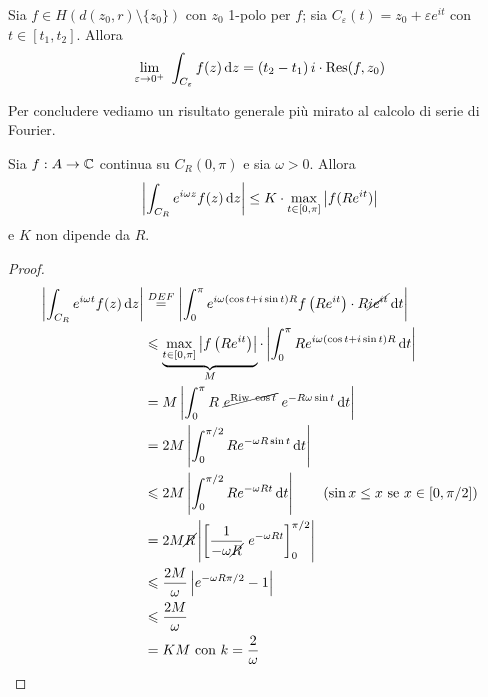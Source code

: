 \begin{coro}
Sia $f\in H(d(z_0,r)\setminus\{z_0\})$ con $z_0$ 1-polo per $f$; sia $C_{\varepsilon}(t)=z_0+\varepsilon e^{it}$ con $t\in[t_1,t_2]$. Allora
\begin{equation*}
\lim_{\varepsilon\rightarrow 0^+}\ \int_{C_{\varepsilon}} f(z)\dz = (t_2-t_1)\,i\cdot\Res(f,z_0) 
\end{equation*}
\end{coro}

Per concludere vediamo un risultato generale più mirato al calcolo di serie di Fourier.

\begin{lemma}[di Jordan]
Sia $f:A\to\mathbb{C}$ continua su $C_R(0,\pi)$ e sia $\omega>0$. Allora
\begin{equation*}
\left| \int_{C_R} e^{i\omega z}f(z)\, \mathrm{d} z \right| \leq K\cdot \max_{t\in[0,\pi]}\left|f(Re^{it})\right|
\end{equation*}
e $K$ non dipende da $R$.
\end{lemma}


\begin{proof}\leavevmode
\begin{equation*}
\begin{aligned}
\left|\int_{C_R} e^{i \omega t} f(z) \, \mathrm{d} z\right| &\stackrel{D E F}{=}\left|\int_0^\pi e^{i \omega(\cos t+i \sin t) R} f\left(R e^{i t}\right) \cdot R \cancel{i e^{i t}} \, \mathrm{d} t\right|\\
&\leqslant \underbrace{\max _{t \in[0, \pi]}\left|f\left(R e^{i t}\right)\right|}_M\cdot\left|\int_0^\pi Re^{i \omega(\cos t+i \sin t) R} \, \mathrm{d} t\right|\\
&=M\left|\int_0^\pi R\ \cancel{e^{\text {Riw } \cos t}}\ e^{-R \omega \sin t} \, \mathrm{d} t\right|\\
&=2 M\left|\int_0^{\pi / 2} R e^{-\omega R \sin t} \, \mathrm{d} t\right|\\
&\leqslant 2 M\left|\int_0^{\pi / 2} R e^{-\omega R t} \, \mathrm{d} t\right| \qquad \left(\sin x\leq x\text{ se } x\in[0,\pi/2]\right)\\
&=2 M \cancel{R}\left|\left[\frac{1}{-\omega \cancel{R}}\ e^{-\omega R t}\right]_0^{\pi / 2}\right|\\
&\leqslant \frac{2 M}{\omega}\left|e^{-\omega R \pi / 2}-1\right|\\
&\leqslant \frac{2 M}{\omega}\\
&=K M \text { con } k=\frac{2}{\omega}
\end{aligned}
\end{equation*}
\end{proof}

